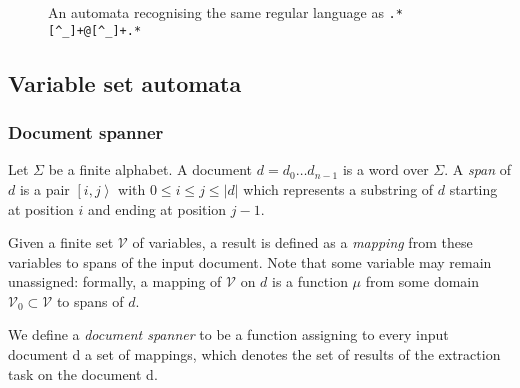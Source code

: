 \documentclass[12px]{article}
\newcommand{\Span}[1]{\left[ #1 \right\rangle}
\begin{document}
        \begin{figure}[ht]%
            \label{fig:automata_simple}
            \centering
            \caption{An automata recognising the same regular language as
            \texttt{.*[\textasciicircum\_]+@[\textasciicircum\_]+.*}}
          \end{figure}

    \subsection{Variable set automata}

      \subsubsection{Document spanner}

        Let $\Sigma$ be a finite alphabet. A document $d = d_0 \dots d_{n-1}$
        is a word over $\Sigma$. A \textit{span} of $d$ is a pair $\Span{i, j}$
        with $0 \leq i \leq j \leq |d|$ which represents a substring of $d$
        starting at position $i$ and ending at position $j - 1$.

        Given a finite set $\mathcal{V}$ of variables, a result is defined as a
        \textit{mapping} from these variables to spans of the input document.
        Note that some variable may remain unassigned: formally, a mapping of
        $\mathcal{V}$ on $d$ is a function $\mu$ from some domain
        $\mathcal{V}_0 \subset \mathcal{V}$ to spans of $d$.

        We define a \textit{document spanner} to be a function assigning to
        every input document d a set of mappings, which denotes the set of
        results of the extraction task on the document d.
\end{document}

